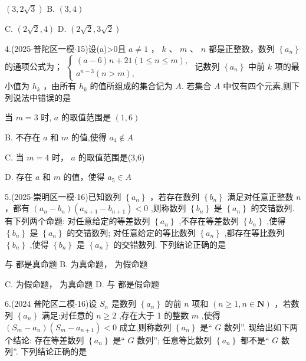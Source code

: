 \xx{}{}{}{}$\left( {3,2\sqrt{3}}\right)$ B. $\left( {3,4}\right)$

C. $\left( {2\sqrt{2},4}\right)$ D. $\left( {2\sqrt{2},3\sqrt{2}}\right)$

4.(2025$\cdot$普陀区一模$\cdot$15)设(a)>0且 $a \neq  1$ ， $k$ 、 $m$ 、 $n$ 都是正整数，数列 $\left\{  {a}_{n}\right\}$ 的通项公式为\blkda[2]{}； $\left\{  \begin{array}{l} \left( {a - 6}\right) n + {21}\left( {1 \leq  n \leq  m}\right) , \\  {a}^{n - 3}\left( {n > m}\right) , \end{array}\right.$ 记数列 $\left\{  {a}_{n}\right\}$ 中前 $k$ 项的最小值为 ${h}_{k}$ ，由所有 ${h}_{k}$ 的值所组成的集合记为 $A$. 若集合 $A$ 中仅有四个元素,则下列说法中错误的是 \dotfill{(\kh{})}

\xx{}{}{}{}当 $m = 3$ 时, $a$ 的取值范围是 $\left( {1,6}\right)$

B. 不存在 $a$ 和 $m$ 的值,使得 ${a}_{4} \notin  A$

C. 当 $m = 4$ 时， $a$ 的取值范围是(3,6)

D. 存在 $a$ 和 $m$ 的值，使得 ${a}_{5} \in  A$

5.(2025$\cdot$崇明区一模$\cdot$16)已知数列 $\left\{  {a}_{n}\right\}$ ，若存在数列 $\left\{  {b}_{n}\right\}$ 满足对任意正整数 $n$ ，都有 $\left( {{a}_{n} - {b}_{n}}\right) \left( {{a}_{n + 1} - }\right.  \left. {b}_{n + 1}\right)  < 0$ ,则称数列 $\left\{  {b}_{n}\right\}$ 是 $\left\{  {a}_{n}\right\}$ 的交错数列. 有下列两个命题:    对任意给定的等差数列 $\left\{  {a}_{n}\right\}$ ,不存在等差数列 $\left\{  {b}_{n}\right\}$ ,使得 $\left\{  {b}_{n}\right\}$ 是 $\left\{  {a}_{n}\right\}$ 的交错数列;    对任意给定的等比数列 $\left\{  {a}_{n}\right\}$ ,都存在等比数列 $\left\{  {b}_{n}\right\}$ ,使得 $\left\{  {b}_{n}\right\}$ 是 $\left\{  {a}_{n}\right\}$ 的交错数列. 下列结论正确的是 \dotfill{(\kh{})}

\xx{}{}{}{}  与  都是真命题 B.   为真命题，  为假命题

C.   为假命题，  为真命题 D.   与  都是假命题

6.(2024 普陀区二模$\cdot$16)设 ${S}_{n}$ 是数列 $\left\{  {a}_{n}\right\}$ 的前 $n$ 项和 $\left( {n \geq  1,n \in  \mathbf{N}}\right)$ ，若数列 $\left\{  {a}_{n}\right\}$ 满足:对任意的 $n \geq  2$ ,存在大于 1 的整数 $m$ ,使得 $\left( {{S}_{m} - {a}_{n}}\right) \left( {{S}_{m} - {a}_{n + 1}}\right)  < 0$ 成立,则称数列 $\left\{  {a}_{n}\right\}$ 是“ $G$ 数列”. 现给出如下两个结论:   存在等差数列 $\left\{  {a}_{n}\right\}$ 是“ $G$ 数列”;    任意等比数列 $\left\{  {a}_{n}\right\}$ 都不是“ $G$ 数列”. 下列结论正确的是 \dotfill{(\kh{})}

